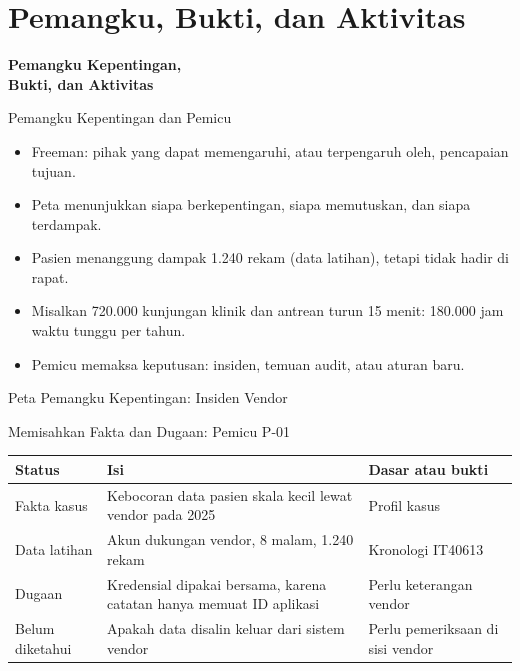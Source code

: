 \documentclass[aspectratio=169, table, 12pt]{beamer}
\begin{document}
\section{Pemangku, Bukti, dan Aktivitas}

\begin{frame}{\hfill}
  \centering
  \Huge{\textbf{Pemangku Kepentingan,\\Bukti, dan Aktivitas}}
\end{frame}

\begin{frame}{{\Large Pemangku Kepentingan dan Pemicu}}
  \vspace{4pt}
  \small
  \begin{itemize}
    \item Freeman: pihak yang dapat memengaruhi, atau terpengaruh oleh, pencapaian tujuan.
    \item Peta menunjukkan siapa berkepentingan, siapa memutuskan, dan siapa terdampak.
    \item Pasien menanggung dampak 1.240 rekam (data latihan), tetapi tidak hadir di rapat.
    \item Misalkan 720.000 kunjungan klinik dan antrean turun 15 menit: 180.000 jam waktu tunggu
          per tahun.
    \item Pemicu memaksa keputusan: insiden, temuan audit, atau aturan baru.
  \end{itemize}
\end{frame}

\begin{frame}{{\Large Peta Pemangku Kepentingan: Insiden Vendor}}
  \centering
  \resizebox{!}{0.7\textheight}{}
\end{frame}

\begin{frame}{{\Large Memisahkan Fakta dan Dugaan: Pemicu P-01}}
  \vspace{2pt}
  \footnotesize
  \begin{tabularx}{\textwidth}{|>{\raggedright\arraybackslash}p{}|>{\raggedright\arraybackslash}X|>{\raggedright\arraybackslash}p{}|}
    \hline
    \textbf{Status} & \textbf{Isi} & \textbf{Dasar atau bukti} \\ \hline
    Fakta kasus & Kebocoran data pasien skala kecil lewat vendor pada 2025 & Profil kasus \\ \hline
    Data latihan & Akun dukungan vendor, 8 malam, 1.240 rekam & Kronologi IT40613 \\ \hline
    Dugaan & Kredensial dipakai bersama, karena catatan hanya memuat ID aplikasi & Perlu keterangan vendor \\ \hline
    Belum diketahui & Apakah data disalin keluar dari sistem vendor & Perlu pemeriksaan di sisi vendor \\ \hline
  \end{tabularx}
\end{frame}
\end{document}
